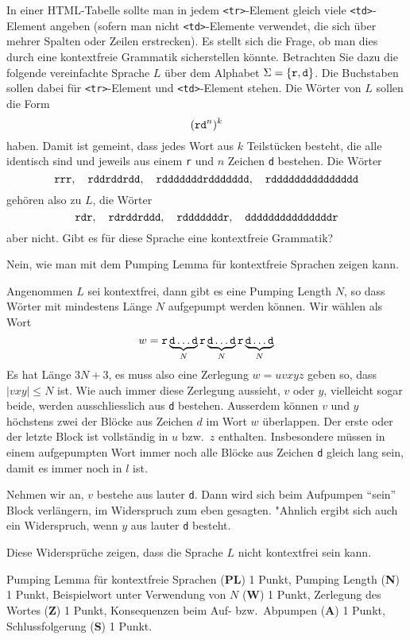 In einer HTML-Tabelle sollte man in jedem {\tt <tr>}-Element gleich
viele {\tt <td>}-Element angeben (sofern man nicht {\tt <td>}-Elemente
verwendet, die sich über mehrer Spalten oder Zeilen erstrecken).
Es stellt sich die Frage, ob man dies durch eine kontextfreie Grammatik
sicherstellen könnte.
Betrachten Sie dazu die folgende vereinfachte Sprache $L$ über dem Alphabet
$\Sigma=\{\text{\tt r}, \text{\tt d}\}$. Die Buchstaben sollen
dabei für {\tt <tr>}-Element und {\tt <td>}-Element stehen.
Die Wörter von $L$ sollen die Form
\[
(\text{\tt rd}^n)^k
\]
haben. Damit ist gemeint, dass jedes Wort aus $k$ Teilstücken besteht,
die alle identisch sind und jeweils aus einem {\tt r} und $n$ Zeichen
{\tt d} bestehen. Die Wörter
\[
\text{\tt rrr}, \quad
\text{\tt rddrddrdd},\quad
\text{\tt rdddddddrddddddd},\quad
\text{\tt rddddddddddddddd}
\]
gehören also zu $L$, die Wörter
\[
\text{\tt rdr}, \quad
\text{\tt rdrddrddd},\quad
\text{\tt rdddddddr},\quad
\text{\tt dddddddddddddddr}
\]
aber nicht.
Gibt es für diese Sprache eine kontextfreie Grammatik?


\begin{loesung}
Nein, wie man mit dem Pumping Lemma für kontextfreie Sprachen zeigen kann.

Angenommen $L$ sei kontextfrei, dann gibt es eine Pumping Length $N$, so
dass Wörter mit mindestens Länge $N$ aufgepumpt werden können. 
Wir wählen als Wort
\[
w=\text{\tt r}
\underbrace{\text{\tt d}\dots\text{\tt d}}_{N}
\text{\tt r}
\underbrace{\text{\tt d}\dots\text{\tt d}}_{N}
\text{\tt r}
\underbrace{\text{\tt d}\dots\text{\tt d}}_{N}
\]
Es hat Länge $3N+3$, es muss also eine Zerlegung $w=uvxyz$ geben
so, dass $|vxy|\le N$ ist. Wie auch immer diese Zerlegung aussieht,
$v$ oder $y$, vielleicht sogar beide, werden ausschliesslich aus {\tt d}
bestehen. Ausserdem können $v$ und $y$ höchstens zwei der Blöcke
aus Zeichen $d$ im Wort $w$ überlappen. Der erste oder der letzte Block
ist vollständig in $u$ bzw.~$z$ enthalten. Insbesondere müssen in
einem aufgepumpten Wort immer noch alle Blöcke aus Zeichen {\tt d}
gleich lang sein, damit es immer noch in $l$ ist.

Nehmen wir an, $v$ bestehe aus lauter {\tt d}. Dann wird sich beim
Aufpumpen ``sein'' Block verlängern, im Widerspruch zum eben gesagten.
"Ahnlich ergibt sich auch ein Widerspruch, wenn  $y$ aus lauter {\tt d}
besteht.

Diese Widersprüche zeigen, dass die Sprache $L$ nicht kontextfrei sein
kann.
\end{loesung}

\begin{bewertung}
Pumping Lemma für kontextfreie Sprachen ({\bf PL}) 1 Punkt,
Pumping Length ({\bf N}) 1 Punkt,
Beispielwort unter Verwendung von $N$ ({\bf W}) 1 Punkt,
Zerlegung des Wortes ({\bf Z}) 1 Punkt,
Konsequenzen beim Auf- bzw.~Abpumpen ({\bf A}) 1 Punkt,
Schlussfolgerung ({\bf S}) 1 Punkt.
\end{bewertung}
